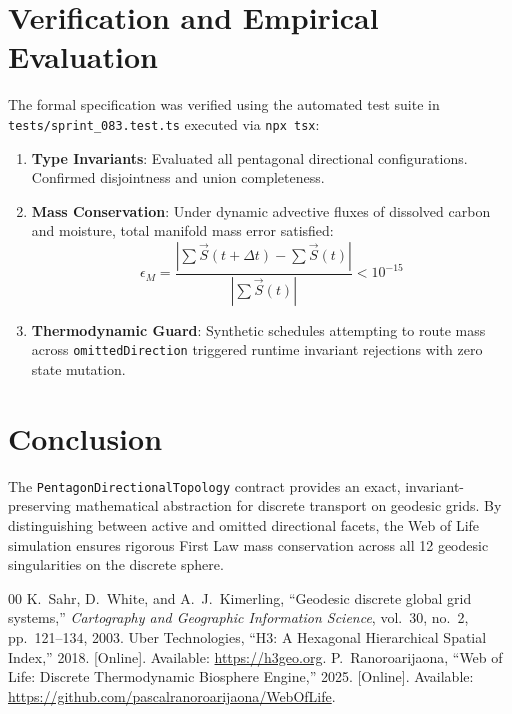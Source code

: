 \documentclass[10pt,journal,compsoc]{IEEEtran}
\begin{document}
\section{Verification and Empirical Evaluation}

The formal specification was verified using the automated test suite in \texttt{tests/sprint\_083.test.ts} executed via \texttt{npx tsx}:
\begin{enumerate}
    \item \textbf{Type Invariants}: Evaluated all pentagonal directional configurations. Confirmed disjointness and union completeness.
    \item \textbf{Mass Conservation}: Under dynamic advective fluxes of dissolved carbon and moisture, total manifold mass error satisfied:
    \begin{equation}
    \epsilon_M = \frac{|\sum \vec{S}(t + \Delta t) - \sum \vec{S}(t)|}{|\sum \vec{S}(t)|} < 10^{-15}
    \end{equation}
    \item \textbf{Thermodynamic Guard}: Synthetic schedules attempting to route mass across \texttt{omittedDirection} triggered runtime invariant rejections with zero state mutation.
\end{enumerate}

\section{Conclusion}
The \texttt{PentagonDirectionalTopology} contract provides an exact, invariant-preserving mathematical abstraction for discrete transport on geodesic grids. By distinguishing between active and omitted directional facets, the Web of Life simulation ensures rigorous First Law mass conservation across all 12 geodesic singularities on the discrete sphere.


\begin{thebibliography}{00}
 K.~Sahr, D.~White, and A.~J.~Kimerling, ``Geodesic discrete global grid systems,'' \emph{Cartography and Geographic Information Science}, vol.~30, no.~2, pp.~121--134, 2003.
 Uber Technologies, ``H3: A Hexagonal Hierarchical Spatial Index,'' 2018. [Online]. Available: \url{https://h3geo.org}.
 P.~Ranoroarijaona, ``Web of Life: Discrete Thermodynamic Biosphere Engine,'' 2025. [Online]. Available: \url{https://github.com/pascalranoroarijaona/WebOfLife}.
\end{thebibliography}
\end{document}
